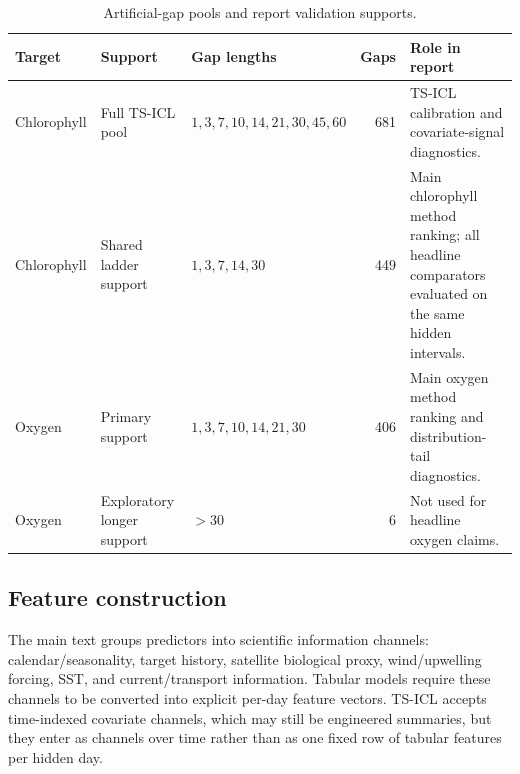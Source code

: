 \begin{table}[h]
  \centering
  \small
  \caption{Artificial-gap pools and report validation supports.}
  \label{tab:appendix_gap_supports}
  \begin{tabularx}{\textwidth}{@{}l l l r X@{}}
    \toprule
    Target & Support & Gap lengths & Gaps & Role in report \\
    \midrule
    Chlorophyll
    & Full TS-ICL pool
    & $1,3,7,10,14,21,30,45,60$
    & 681
    & TS-ICL calibration and covariate-signal diagnostics. \\

    Chlorophyll
    & Shared ladder support
    & $1,3,7,14,30$
    & 449
    & Main chlorophyll method ranking; all headline comparators evaluated on the same hidden intervals. \\

    Oxygen
    & Primary support
    & $1,3,7,10,14,21,30$
    & 406
    & Main oxygen method ranking and distribution-tail diagnostics. \\

    Oxygen
    & Exploratory longer support
    & $>30$
    & 6
    & Not used for headline oxygen claims. \\
    \bottomrule
  \end{tabularx}
\end{table}
\vspace{-0.5cm}
\subsection{Feature construction}
\label{app:feature_model_details}

The main text groups predictors into scientific information channels: calendar/seasonality, target
history, satellite biological proxy, wind/upwelling forcing, SST, and
current/transport information. Tabular models require these channels to be converted into explicit
per-day feature vectors. TS-ICL accepts time-indexed covariate channels, which may still be engineered summaries, but they enter as channels over time rather than as one fixed row of
tabular features per hidden day.

